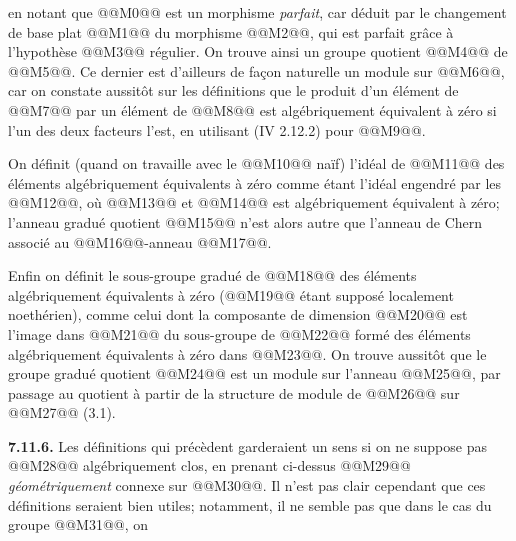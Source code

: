 
en notant que @@M0@@ est un morphisme \emph{parfait}, car déduit par le changement de base plat @@M1@@ du morphisme @@M2@@, qui est parfait grâce à l'hypothèse @@M3@@ régulier. On trouve ainsi un groupe quotient
@@M4@@
de @@M5@@. Ce dernier est d'ailleurs de façon naturelle un module sur @@M6@@, car on constate aussitôt sur les définitions que le produit d'un élément de @@M7@@ par un élément de @@M8@@ est algébriquement équivalent à zéro si l'un des deux facteurs l'est, en utilisant (IV 2.12.2) pour @@M9@@.

On définit (quand on travaille avec le @@M10@@ naïf) l'idéal de @@M11@@ des éléments algébriquement équivalents à zéro comme étant l'idéal engendré par les @@M12@@, où @@M13@@ et @@M14@@ est algébriquement équivalent à zéro; l'anneau gradué quotient
@@M15@@
n'est alors autre que l'anneau de Chern associé au @@M16@@-anneau @@M17@@.

Enfin on définit le sous-groupe gradué de @@M18@@ des éléments algébriquement équivalents à zéro (@@M19@@ étant supposé localement noethérien), comme celui dont la composante de dimension @@M20@@ est l'image dans @@M21@@ du sous-groupe de @@M22@@ formé des éléments algébriquement équivalents à zéro dans @@M23@@. On trouve aussitôt que le groupe gradué quotient
@@M24@@
est un module sur l'anneau @@M25@@, par passage au quotient à partir de la structure de module de @@M26@@ sur @@M27@@ (3.1).

\textbf{7.11.6.} Les définitions qui précèdent garderaient un sens si on ne suppose pas @@M28@@ algébriquement clos, en prenant ci-dessus @@M29@@ \emph{géométriquement} connexe sur @@M30@@. Il n'est pas clair cependant que ces définitions seraient bien utiles; notamment, il ne semble pas que dans le cas du groupe @@M31@@, on
